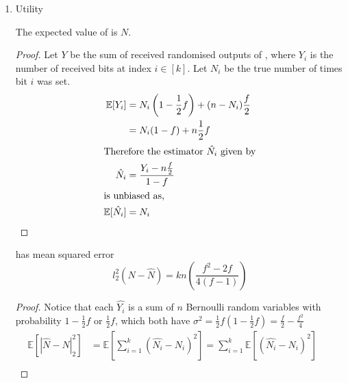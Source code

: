\documentclass{article}
\begin{document}
\begin{enumerate}
\begin{proof}
\begin{align}
	\end{align}
	Notice that by equation~\ref{eq:privacy:cancel-k} the privacy is not dependent on $k$ and equation~\ref{eq:maximise-product} is maximised when $y_1=1,\ldots,y_m=1$, and $y_{m+1},\ldots,y_{2m}=0$, giving
	\begin{align*}
		D &\leq \left(1-\frac{1}{2}f\right)^{2m}\times\left(\frac{1}{2}f\right)^{-2m}\\
			&= \left(\frac{2-f}{f}\right)^{2m}
	\end{align*}
	Therefore,
	\begin{equation}
		\varepsilon \leq 2m\log\left(\frac{2-f}{f}\right)
	\end{equation}
\end{proof}
\item Utility
\begin{theorem}
\label{thm:unbiased-estimator}
	The expected value of  is $N$.
\end{theorem}
\begin{proof} Let $Y$ be the sum of received randomised outputs of , where $Y_i$ is the number of received bits at index $i\in [k]$. Let $N_i$ be the true number of times bit $i$ was set.
\begin{align}
\mathbb{E}[Y_i] &= N_i\left(1-\frac{1}{2}f\right) + (n-N_i)\frac{f}{2}\nonumber\\
	&= N_i(1-f) + n\frac{1}{2}f\nonumber\\
	\intertext{Therefore the estimator $\hat{N_i}$ given by}
\hat{N_i} &= \frac{Y_i-n\frac{f}{2}}{1-f}\label{eq:estimator}\\
\intertext{is unbiased as,}
\mathbb{E}[\hat{N_i}] &= N_i
\end{align}
\end{proof}
\begin{theorem}
	 has mean squared error
	\begin{equation*}
		l_2^2(N-\hat{N}) = kn\left(\frac{f^2-2f}{4(f-1)}\right)
	\end{equation*}
\end{theorem}
\begin{proof}\hfill
Notice that each $\hat{Y_i}$ is a sum of $n$ Bernoulli random variables with probability $1-\frac{1}{2}f$ or $\frac{1}{2}f$, which both have $\sigma^2 = \frac{1}{2}f\left(1-\frac{1}{2}f\right) = \frac{f}{2}-\frac{f^2}{4}$
	\begin{align*}
		\mathbb{E}[|\hat{N}-N|_2^2] &= \mathbb{E}[\sum\limits_{i=1}^k(\hat{N_i}-N_i)^2] = \sum\limits_{i=1}^k\mathbb{E}[(\hat{N_i}-N_i)^2] &&\\

\end{align*}
\end{proof}
\end{enumerate}
\end{document}
